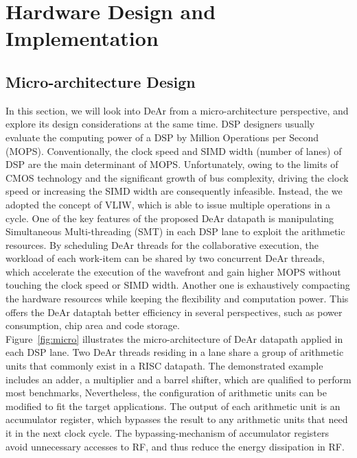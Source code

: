 \chapter{Hardware Design and Implementation}
    \section{Micro-architecture Design}
        In this section, we will look into DeAr from a micro-architecture perspective, and explore its design considerations at the same time.
        DSP designers usually evaluate the computing power of a DSP by Million Operations per Second (MOPS).
        Conventionally, the clock speed and SIMD width (number of lanes) of DSP are the main determinant of MOPS.
        Unfortunately, owing to the limits of CMOS technology and the significant growth of bus complexity, 
        driving the clock speed or increasing the SIMD width are consequently infeasible.
        Instead, the we adopted the concept of VLIW, which is able to issue multiple operations in a cycle.
        One of the key features of the proposed DeAr datapath is manipulating Simultaneous Multi-threading (SMT) in each DSP lane to exploit the arithmetic resources.
        By scheduling DeAr threads for the collaborative execution, the workload of each work-item can be shared by two concurrent DeAr threads, 
        which accelerate the execution of the wavefront and gain higher MOPS without touching the clock speed or SIMD width.
        Another one is exhaustively compacting the hardware resources while keeping the flexibility and computation power.
        This offers the DeAr dataptah better efficiency in several perspectives, such as power consumption, chip area and code storage.
        \\\indent
        Figure~\ref{fig:micro} illustrates the micro-architecture of DeAr datapath applied in each DSP lane.
        Two DeAr threads residing in a lane share a group of arithmetic units that commonly exist in a RISC datapath.
        The demonstrated example includes an adder, a multiplier and a barrel shifter, which are qualified to perform most benchmarks,
        Nevertheless, the configuration of arithmetic units can be modified to fit the target applications.
        The output of each arithmetic unit is an accumulator register, 
        which bypasses the result to any arithmetic units that need it in the next clock cycle.
        The bypassing-mechanism of accumulator registers avoid unnecessary accesses to RF, 
        and thus reduce the energy dissipation in RF.
